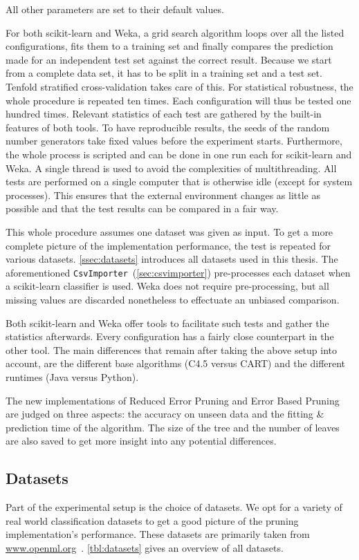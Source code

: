 All other parameters are set to their default values.

For both scikit-learn and Weka, a grid search algorithm loops over all the listed configurations, fits them to a training set and finally compares the prediction made for an independent test set against the correct result. Because we start from a complete data set, it has to be split in a training set and a test set. Tenfold stratified cross-validation takes care of this. For statistical robustness, the whole procedure is repeated ten times. Each configuration will thus be tested one hundred times. Relevant statistics of each test are gathered by the built-in features of both tools. To have reproducible results, the seeds of the random number generators take fixed values before the experiment starts. Furthermore, the whole process is scripted and can be done in one run each for scikit-learn and Weka. A single thread is used to avoid the complexities of multithreading. All tests are performed on a single computer that is otherwise idle (except for system processes). This ensures that the external environment changes as little as possible and that the test results can be compared in a fair way.

This whole procedure assumes one dataset was given as input. To get a more complete picture of the implementation performance, the test is repeated for various datasets. \autoref{ssec:datasets} introduces all datasets used in this thesis. The aforementioned \texttt{CsvImporter}~(\autoref{sec:csvimporter}) pre-processes each dataset when a scikit-learn classifier is used. Weka does not require pre-processing, but all missing values are discarded nonetheless to effectuate an unbiased comparison.

Both scikit-learn and Weka offer tools to facilitate such tests and gather the statistics afterwards. Every configuration has a fairly close counterpart in the other tool. The main differences that remain after taking the above setup into account, are the different base algorithms (C4.5 versus CART) and the different runtimes (Java versus Python).

The new implementations of Reduced Error Pruning and Error Based Pruning are judged on three aspects: the accuracy on unseen data and the fitting \& prediction time of the algorithm. The size of the tree and the number of leaves are also saved to get more insight into any potential differences.

\subsection{Datasets}\label{ssec:datasets}
Part of the experimental setup is the choice of datasets. We opt for a variety of real world classification datasets to get a good picture of the pruning implementation's performance. These datasets are primarily taken from \url{www.openml.org}~\cite{openml}. \autoref{tbl:datasets} gives an overview of all datasets.

